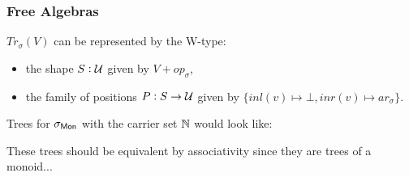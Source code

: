 \documentclass[9pt]{beamer}
\begin{document}
\begin{frame}
\frametitle{Free Algebras}
  $Tr_\sigma(V)$ can be represented by the W-type:
\begin{itemize}
  \item the \alert{shape} $S : \mathcal{U}$ given by $V + op_\sigma$,
  \item the \alert{family of positions} $P : S \to \mathcal{U}$ given by
    $\{ inl(v) \mapsto \bot, inr(v) \mapsto ar_\sigma \}$.
\end{itemize}

Trees for $\sigma_{\operatorname{\mathsf{Mon}}}$ with the carrier set $\mathbb{N}$ would look like:
\begin{center}
\end{center}

These trees should be equivalent by associativity since they are trees of a monoid...

\end{frame}
\end{document}
